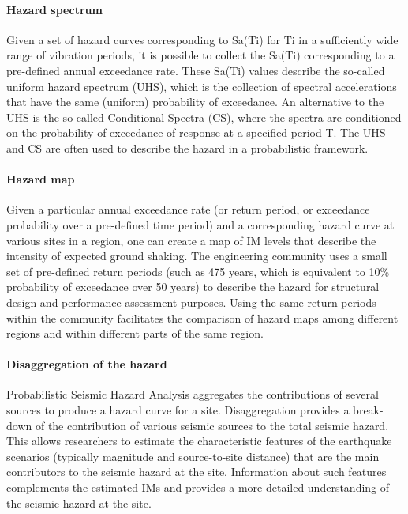 \paragraph{Hazard spectrum} Given a set of hazard curves corresponding to Sa(Ti) for Ti in a sufficiently wide range of vibration periods, it is possible to collect the Sa(Ti) corresponding to a pre-defined annual exceedance rate. These Sa(Ti) values describe the so-called uniform hazard spectrum (UHS), which is the collection of spectral accelerations that have the same (uniform) probability of exceedance. An alternative to the UHS is the so-called Conditional Spectra (CS), where the spectra are conditioned on the probability of exceedance of response at a specified period T. The UHS and CS are often used to describe the hazard in a probabilistic framework.

\paragraph{Hazard map} Given a particular annual exceedance rate (or return period, or exceedance probability over a pre-defined time period) and a corresponding hazard curve at various sites in a region, one can create a map of IM levels that describe the intensity of expected ground shaking. The engineering community uses a small set of pre-defined return periods (such as 475 years, which is equivalent to 10\% probability of exceedance over 50 years) to describe the hazard for structural design and performance assessment purposes. Using the same return periods within the community facilitates the comparison of hazard maps among different regions and within different parts of the same region.

\paragraph{Disaggregation of the hazard} Probabilistic Seismic Hazard Analysis aggregates the contributions of several sources to produce a hazard curve for a site. Disaggregation provides a break-down of the contribution of various seismic sources to the total seismic hazard. This allows researchers to estimate the characteristic features of the earthquake scenarios (typically magnitude and source-to-site distance) that are the main contributors to the seismic hazard at the site. Information about such features complements the estimated IMs and provides a more detailed understanding of the seismic hazard at the site.

